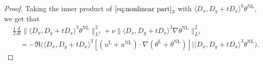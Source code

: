 \documentclass[reqno, 12pt]{amsart} %
\theoremstyle{plain} %
\theoremstyle{definition}
\theoremstyle{remark}
\numberwithin{equation}{section} %
\begin{document}
	\begin{proof}
		Taking the inner product of $\eqref{eq:nonlinear part}_2$ with $\langle D_x, D_y+t D_x\rangle^6  \theta^{\mathrm{NL}}$, we get that
		\begin{equation}\begin{aligned} \label{eq:energy est of non theta}
				&  \frac12 \frac{d}{ d t}\|\langle D_x, D_y+t D_x\rangle^3 \theta^{\mathrm{NL}}\|_{L^2}^2+\nu\|\langle D_x, D_y+t D_x\rangle^3 \nabla \theta^{\mathrm{NL}}\|_{L^2}^2 \\
				& \quad=-\Re\big(\langle D_x, D_y+t D_x\rangle^3\left[(u^{\mathrm{L}}+u^{\mathrm{NL}}) \cdot \nabla(\theta^{\mathrm{L}}  +  \theta^{\mathrm{NL}})\right]  \big| \langle D_x, D_y+t D_x\rangle^3 \theta^{\mathrm{NL}}\big) .
		\end{aligned}\end{equation}
		

\end{proof}
\end{document}
